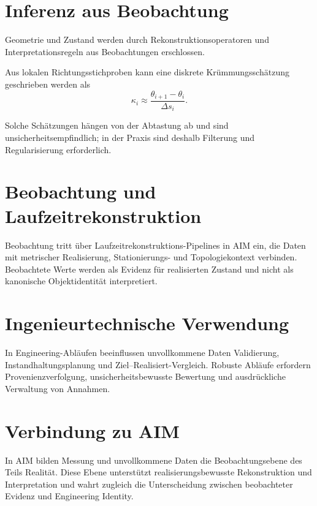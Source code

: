 \section{Inferenz aus Beobachtung}
Geometrie und Zustand werden durch Rekonstruktionsoperatoren und
Interpretationsregeln aus Beobachtungen erschlossen.
\begin{definition}
Aus lokalen Richtungsstichproben kann eine diskrete Krümmungsschätzung
geschrieben werden als
\[
\kappa_i \approx \frac{\theta_{i+1}-\theta_i}{\Delta s_i}.
\]
\end{definition}
Solche Schätzungen hängen von der Abtastung ab und sind
unsicherheitsempfindlich; in der Praxis sind deshalb Filterung und
Regularisierung erforderlich.

\section{Beobachtung und Laufzeitrekonstruktion}
Beobachtung tritt über Laufzeitrekonstruktions-Pipelines in AIM ein, die Daten
mit metrischer Realisierung, Stationierungs- und Topologiekontext verbinden.
Beobachtete Werte werden als Evidenz für realisierten Zustand und nicht als
kanonische Objektidentität interpretiert.

\section{Ingenieurtechnische Verwendung}
In Engineering-Abläufen beeinflussen unvollkommene Daten Validierung,
Instandhaltungsplanung und Ziel--Realisiert-Vergleich. Robuste Abläufe
erfordern Provenienzverfolgung, unsicherheitsbewusste Bewertung und
ausdrückliche Verwaltung von Annahmen.

\section{Verbindung zu AIM}
\begin{summary}
In AIM bilden Messung und unvollkommene Daten die Beobachtungsebene des Teils
Realität. Diese Ebene unterstützt realisierungsbewusste Rekonstruktion und
Interpretation und wahrt zugleich die Unterscheidung zwischen beobachteter
Evidenz und Engineering Identity.
\end{summary}
